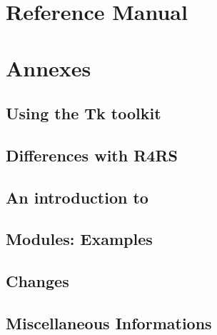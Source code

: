 \documentclass[11pt,a4paper]{book}
\begin{document}

\chead{}
\lfoot{}
\cfoot{\fancyplain{\bf\thepage}{}}
\rfoot{}


%
%
\tableofcontents



%
%
\part{Reference Manual}
\pagestyle{fancy}
\thispagestyle{plain}




%
%
\part{Annexes}
\appendix


\chapter{Using the Tk toolkit}


\chapter{Differences with R4RS}


\chapter{An introduction to {\stklos}}


\chapter{Modules: Examples}


\chapter{Changes}


\chapter{Miscellaneous Informations}




\begin{theindex}
\bigskip

\end{theindex}
\end{document}
